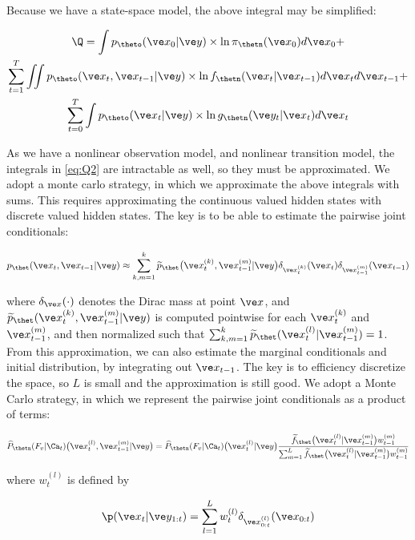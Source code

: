 Because we have a state-space model, the above integral may be simplified:

\begin{multline} \label{eq:Q2}
\Q = \int p_{\theto}(\x_0 | \yT)  \times \ln \pi_{\thetn}(\x_0) d\x_0 + \\
\sum_{t=1}^T \iint p_{\theto} (\x_t, \x_{t-1} | \yT) \times \ln f_{\thetn}(\x_t | \x_{t-1}) d\x_t d\x_{t-1} + \\
\sum_{t=0}^T \int p_{\theto} (\x_t | \yT) \times \ln g_{\thetn}(\y_t | \x_t) d\x_t
\end{multline}

As we have a nonlinear observation model, and nonlinear transition model, the integrals in \eqref{eq:Q2} are intractable as well, so they must be approximated. We adopt a monte carlo strategy, in which we approximate the above integrals with sums. This requires approximating the continuous valued hidden states with discrete valued hidden states. The key is to be able to estimate the pairwise joint conditionals:

\begin{align}
p_{\thet} (\x_t, \x_{t-1} | \yT) \approx \sum_{k,m=1}^k \widetilde{p}_{\thet} \big(\x_t^{(k)}, \x_{t-1}^{(m)} | \yT\big) \delta_{\x_t^{(k)}}(\x_t) \delta_{\x_{t-1}^{(m)}} (\x_{t-1})
\end{align}

\noindent where $\delta_{\x}(\cdot)$ denotes the Dirac mass at point $\x$, and $\widetilde{p}_{\thet}(\x_t^{(k)},  \x_{t-1}^{(m)} | \yT)$ is computed pointwise for each $\x_t^{(k)}$ and $\x_{t-1}^{(m)}$, and then normalized such that $\sum_{k,m=1}^k \widetilde{p}_{\thet}(\x_t^{(l)} | \x_{t-1}^{(m)})=1$. From this approximation, we can also estimate the marginal conditionals and initial distribution, by integrating out $\x_{t-1}$. The key is to efficiency discretize the space, so $L$ is small and the approximation is still good.  We adopt a Monte Carlo strategy, in which we represent the pairwise joint conditionals as a product of terms:

\begin{align}
 \phat \big(\x_t^{(l)}, \x_{t-1}^{(m)} | \yT\big) = \phat \big(\x_t^{(l)} | \yT\big) \frac{\fhat w_{t-1}^{(m)}} {\sum_{m=1}^L  \fhat w_{t-1}^{(m)}}
\end{align}

\noindent where $w_t^{(l)}$ is defined by

\begin{align}
\p(\x_{t} | \y_{1:t}) = \sum_{l=1}^L w_t^{(l)} \delta_{\x_{0:t}^{(l)}} (\x_{0:t})
\end{align}

